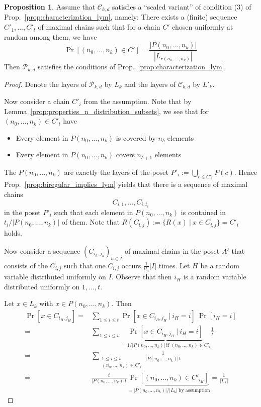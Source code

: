 \documentclass{scrartcl}
\theoremstyle{definition}
\newtheorem{proposition}[definition]{Proposition}
\begin{document}
\begin{proposition}
    \label{prop:core_of_multisets}
    Assume that $\mathcal{C}_{k, d}$ satisfies a ``scaled variant'' of condition (3) of Prop.~\ref{prop:characterization_lym}, namely:
    There exists a (finite) sequence $C'_1, ..., C'_t$ of maximal chains such that for a chain $C'$ chosen uniformly at random among them, we have
    \begin{equation*}
        \Pr[ (n_0, ..., n_k) \in C' ] = \frac {|P(n_0, ..., n_k)|} {|L_{r(n_0, ..., n_k)}|}
    \end{equation*}
    Then $\mathcal{P}_{k, d}$ satisfies the conditions of Prop.~\ref{prop:characterization_lym}.
\end{proposition}
\begin{proof}
    Denote the layers of $\mathcal{P}_{k, d}$ by $L_k$ and the layers of $\mathcal{C}_{k, d}$ by $L'_k$.

    Now consider a chain $C'_i$ from the assumption.
    Note that by Lemma~\ref{prop:properties_n_distribution_subsets}, we see that for $(n_0, ..., n_k) \in C'_i$ have
    \begin{itemize}
        \item Every element in $P(n_0, ..., n_k)$ is covered by $n_\delta$ elements
        \item Every element in $P(n_0, ..., n_k)$ covers $n_{\delta + 1}$ elements
    \end{itemize}
    The $P(n_0, ..., n_k)$ are exactly the layers of the poset $P'_i := \bigcup_{c \in C'_i} P(c)$.
    Hence Prop.~\ref{prop:biregular_implies_lym} yields that there is a sequence of maximal chains
    \begin{equation*}
        C_{i, 1}, ..., C_{i, t_i}
    \end{equation*}
    in the poset $P'_i$ such that each element in $P(n_0, ..., n_k)$ is contained in $t_i/|P(n_0, ..., n_k)|$ of them.
    Note that $R(C_{i, j}) := \{ R(x) \ | \ x \in C_{i, j} \} = C'_i$ holds.

    Now consider a sequence $(C_{i_h, j_h})_{h \in I}$ of maximal chains in the poset $A'$ that consists of the $C_{i, j}$ such that one $C_{i, j}$ occurs $\frac 1 {t t_i} |I|$ times.
    Let $H$ be a random variable distributed uniformly on $I$.
    Observe that then $i_H$ is a random variable distributed uniformly on $1, ..., t$.

    Let $x \in L_k$ with $x \in P(n_0, ..., n_k)$.
    Then
    \begin{align*}
        \Pr[x \in C_{i_H, j_H}] =& \sum_{1 \leq i \leq t} \Pr[x \in C_{i_H, j_H} \ | \ i_H = i] \ \Pr[i_H = i] \\
        =& \sum_{1 \leq i \leq t} \underbrace{\Pr[x \in C_{i_H, j_H} \ | \ i_H = i]}_{ = 1 / |P(n_0, ..., n_k)| \ \text{if $(n_0, ..., n_k) \in C'_i$}} \frac 1 t \\
        =& \sum_{\substack{1 \leq i \leq t\\(n_0, ..., n_k) \in C'_i}} \frac 1 {|P(n_0, ..., n_k)| t} \\
        =& \frac t {|P(n_0, ..., n_k)| t} \underbrace{\Pr[(n_0, ..., n_k) \in C'_{i_H}]}_{= |P(n_0, ..., n_k)| / |L_k| \ \text{by assumption}} = \frac 1 {|L_k|}
    \end{align*}


\end{proof}
\end{document}
